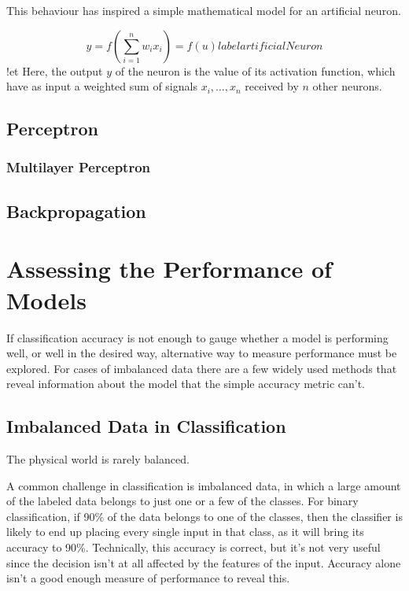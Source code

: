 This behaviour has inspired a simple mathematical model for an artificial neuron.

\begin{equation}
 y = f\left(\sum_{i=1}^n w_ix_i\right) = f(u)
 label{artificialNeuron}
\end{equation}
!et
Here, the output $y$ of the neuron is the value of its activation function, which have as input
a weighted sum of signals $x_i, \dots ,x_n$ received by $n$ other neurons.

\subsection{Perceptron}

\subsubsection{Multilayer Perceptron}

\subsection{Backpropagation}

\section{Assessing the Performance of Models}
If classification accuracy is not enough to gauge whether a model is
performing well, or well in the desired way, alternative way to measure
performance must be explored. For cases of imbalanced data there are a few
widely used methods that reveal information about the model that the simple
accuracy metric can't.

\subsection{Imbalanced Data in Classification}
The physical world is rarely balanced.

A common challenge in classification is imbalanced data, in which a large
amount of the labeled data belongs to just one or a few of the classes.
For binary classification, if 90\% of the data belongs to one of the classes,
then the classifier is likely to end up placing every single
input in that class, as it will bring its accuracy to 90\%. Technically, this
accuracy is correct, but it's not very useful since the decision isn't at all
affected by the features of the input. Accuracy alone isn't a good enough
measure of performance to reveal this.

